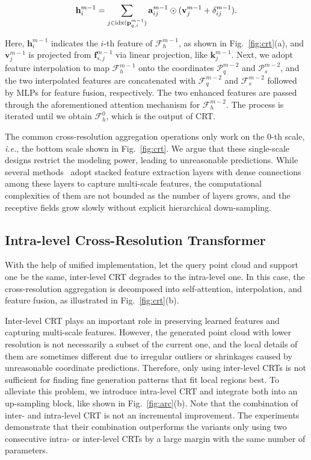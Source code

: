 \documentclass[letterpaper]{article} %
\newcommand{\ve}[1]{\mathbf{#1}} %
\begin{document}
\begin{equation}
\ve{h}_i^{m-1}  = \sum_{j \in {\rm idx}(\ve{p}^{m-1}_{q, i}) }\ve{a}_{ij}^{m-1} \odot  (\ve{v}_j^{m-1} + \delta^{m-1}_{ij}). 
\end{equation} 

{\noindent}Here, $\ve{h}_i^{m-1}$ indicates the $i$-th feature of $\mathcal{F}_h^{m-1}$, as shown in Fig.~\ref{fig:crt}(a), and $\ve{v}^{m-1}_j$ is projected from $\ve{f}^{m-1}_{s, j}$ via linear projection, like $\ve{k}^{m-1}_j$. 
Next, we adopt feature interpolation \cite{qi2017pointnet++} to map $\mathcal{F}_h^{m-1}$ onto the coordinates $\mathcal{P}_q^{m-2}$ and $\mathcal{P}_s^{m-2}$, 
and the two interpolated features are concatenated with $\mathcal{F}_q^{m-2}$ and $\mathcal{F}_s^{m-2}$ followed by MLPs for feature fusion, respectively. 
The two enhanced features are passed through the aforementioned attention mechanism for $\mathcal{F}_h^{m-2}$. 
The process is iterated until we obtain $\mathcal{F}_h^{0}$, which is the output of CRT.

The common cross-resolution aggregation operations only work on the $0$-th scale, {\em i.e.}, the bottom scale shown in Fig.~\ref{fig:crt}. 
We argue that these single-scale designs restrict the modeling power, leading to unreasonable predictions. 
While several methods~\cite{qian2021pu, he2023grad} adopt stacked feature extraction layers with dense connections among these layers to capture multi-scale features, the computational complexities of them are not bounded as the number of layers grows, and the receptive fields grow slowly without explicit hierarchical down-sampling. 


\subsection{Intra-level Cross-Resolution Transformer}
With the help of unified implementation, let the query point cloud and support one be the same, inter-level CRT degrades to the intra-level one. 
In this case, the cross-resolution aggregation is decomposed into self-attention, interpolation, and feature fusion, as illustrated in Fig.~\ref{fig:crt}(b). 

Inter-level CRT plays an important role in preserving learned features and capturing multi-scale features.
However, the generated point cloud with lower resolution is not necessarily a subset of the current one, and the local details of them are sometimes different due to  irregular outliers or shrinkages caused by unreasonable coordinate predictions. 
Therefore, only using inter-level CRTs is not sufficient for finding fine generation patterns that fit local regions best. 
To alleviate this problem, we introduce intra-level  CRT and integrate both into an up-sampling block, like shown in Fig.~\ref{fig:arc}(b). 
Note that the combination of inter- and intra-level CRT is not an incremental improvement. 
The experiments demonstrate that their combination outperforms the variants only using two consecutive intra- or inter-level CRTs by a large margin  with the same number of parameters.
\end{document}
